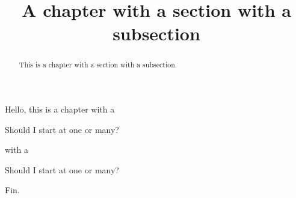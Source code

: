 \documentclass{ximera}
\title{A chapter with a section with a subsection}
\begin{document}
\begin{abstract}
  This is a chapter with a section with a subsection.
\end{abstract}
\maketitle




Hello, this is a chapter with a



\begin{theorem}
  Should I start at one or many?
\end{theorem}
with a


\begin{theorem}
  Should I start at one or many?
\end{theorem}



Fin.
\end{document}
